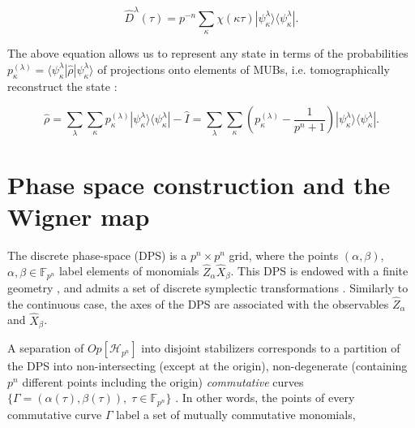 \documentclass[quantumrep,article,submit,pdftex,moreauthors]{Definitions/mdpi}
\begin{document}
\begin{equation}
  \hat{D}^{\lambda }(\tau )
  = p^{-n} \sum_{\kappa }\chi (\kappa \tau )
  |\psi _{\kappa }^{\lambda }\rangle \langle \psi _{\kappa }^{\lambda }|.
  \label{Dexp}
\end{equation}

The above equation allows us to represent any state in terms of the
probabilities $p_{\kappa }^{(\lambda )} = \langle \psi_{\kappa
}^{\lambda}|\hat{\rho}|\psi _{\kappa }^{\lambda }\rangle $ of projections onto
elements of MUBs, i.e. tomographically reconstruct the state
\cite{gibbons,galvao,cormick,ivanovic,DFW11,DFW12,Durt2006}:

\begin{equation}
  \hat{\rho}
  = \sum_{\lambda }\sum_{\kappa }
  p_{\kappa}^{(\lambda)} |\psi_{\kappa }^{\lambda }\rangle
  \langle \psi _{\kappa }^{\lambda }| - \hat{I}
  = \sum_{\lambda }\sum_{\kappa }\left( p_{\kappa }^{(\lambda)} -
  \frac{1}{p^{n}+1}\right) |\psi _{\kappa }^{\lambda }\rangle \langle
  \psi_{\kappa }^{\lambda }|.
  \label{tom r}
\end{equation}


\section{Phase space construction and the Wigner map}

The discrete phase-space (DPS) \cite{gibbons,galvao,cormick,DFW11,DFW12} is a
$p^{n}\times p^{n}$ grid, where the points $(\alpha ,\beta )$, $\alpha,\beta \in
\mathbb{F}_{p^{n}}$ label elements of monomials $\hat{Z}_{\alpha
}\hat{X}_{\beta}$. This DPS is endowed with a finite geometry
\cite{gibbons,galvao,cormick,DFW11,DFW12,FF}, and admits a set of discrete
symplectic transformations \cite{DFW2-1,DFW2-2,DFW2-3,DFW2-4,klimov06}.
Similarly to the continuous case, the axes of the DPS are associated with the
observables $\hat{Z}_{\alpha}$ and $\hat{X}_{\beta}$.

A separation of $Op[\mathcal{H}_{p^{n}}]$ into disjoint stabilizers corresponds
to a partition of the DPS into non-intersecting (except at the origin),
non-degenerate (containing $p^{n}$ different points including the origin)
\textit{commutative} curves $\{\Gamma =\left( \alpha (\tau ),\beta
(\tau)\right), \; \tau \in \mathbb{F}_{p^{n}}\}$ \cite{GS2,JPA09}. {\color{teal}
In other words, the points of every commutative curve $\Gamma$ label a set of
mutually commutative monomials,}
\end{document}
